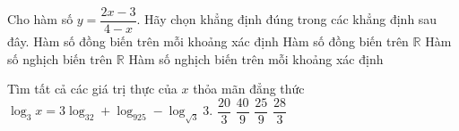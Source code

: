 \begin{ex}%
	Cho hàm số $y=\dfrac{2x-3}{4-x}$. Hãy chọn khẳng định đúng trong các khẳng định sau đây.
	\choice
	{\True Hàm số đồng biến trên mỗi khoảng xác định}
	{Hàm số đồng biến trên $\mathbb{R}$}
	{Hàm số nghịch biến trên $\mathbb{R}$}
	{Hàm số nghịch biến trên mỗi khoảng xác định}
\end{ex}
\begin{ex}%
	Tìm tất cả các giá trị thực của $x$ thỏa mãn đẳng thức $\log_3x=3\log_32+\log_925-\log_{\sqrt{3}}3$.
	\choice
	{$\dfrac{20}{3}$}
	{\True $\dfrac{40}{9}$}
	{$\dfrac{25}{9}$}
	{$\dfrac{28}{3}$}
\end{ex}
